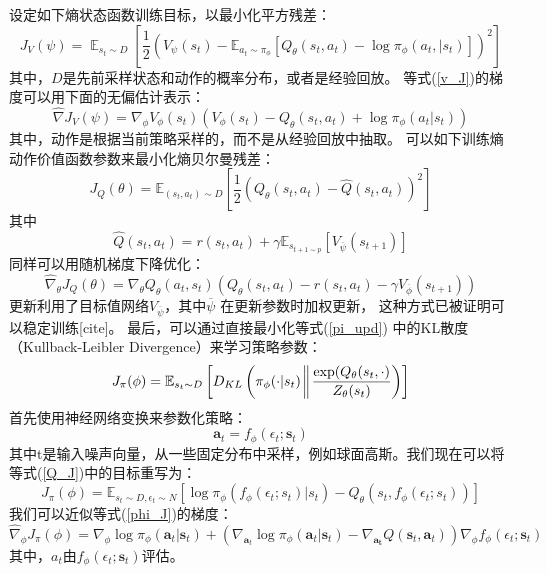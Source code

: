 \documentclass[AutoFakeBold]{LZUThesis}
\begin{document}
设定如下熵状态函数训练目标，以最小化平方残差：
\begin{equation}
  J_{V}(\psi) = \mathop{\mathbb{E}}_{s_t \sim D}
  \left[ \frac12 ( V_{\psi}(s_t) - \mathbb{E}_{a_t \sim \pi_{\phi}}
  \left[ Q_\theta(s_t, a_t) - \log \pi_{\phi}(a_t, | s_t) \right] )^2 \right]
  \label{v_J}
\end{equation}
其中，$D$是先前采样状态和动作的概率分布，或者是经验回放。
等式(\ref{v_J})的梯度可以用下面的无偏估计表示：
\begin{equation}
  \hat{\nabla} J_V(\psi) = \nabla_\phi V_\phi(s_t) 
  (V_\phi(s_t) - Q_\theta(s_t, a_t) + \log \pi_{\phi} (a_t | s_t))
\end{equation}
其中，动作是根据当前策略采样的，而不是从经验回放中抽取。
可以如下训练熵动作价值函数参数来最小化熵贝尔曼残差：
\begin{equation}
  J_Q(\theta) = \mathbb{E}_{(s_t, a_t) \sim D} \left[ 
  \frac12 (Q_\theta(s_t, a_t) - \hat{Q}(s_t, a_t))^2 \right]
\end{equation}
其中
\begin{equation}
  \hat{Q}(s_t, a_t) = r(s_t, a_t) + \gamma 
  \mathbb{E}_{s_{t + 1 \sim p}} \left[ V_{\overline{\psi}}(s_{t + 1}) \right]
\end{equation}
同样可以用随机梯度下降优化：
\begin{equation}
  \hat{\nabla}_\theta J_Q(\theta) = \nabla_\theta Q_\theta(a_t, s_t)
  (Q_\theta(s_t, a_t) - r(s_t, a_t) - \gamma V_{\overline{\phi}}(s_{t + 1}))
\end{equation}
更新利用了目标值网络$V_{\overline{\psi}}$，其中$\overline{\psi}$
在更新参数时加权更新，
这种方式已被证明可以稳定训练[cite]。
最后，可以通过直接最小化等式(\ref{pi_upd})
中的KL散度（Kullback-Leibler Divergence）来学习策略参数：
\begin{equation}
  J_\pi(\phi) = \mathbb{E}_{s_t \sim D} \left[ D_{KL} 
  \left( \pi_{\phi}(\cdot | s_t) \bigg\Arrowvert 
  \frac{\exp (Q_\theta(s_t, \cdot)}{Z_{\theta}(s_t)} \right) \right]
  \label{Q_J}
\end{equation}
首先使用神经网络变换来参数化策略：
\begin{equation}
  \mathbf{a}_t = f_{\phi}(\epsilon_t;\mathbf{s}_t)
\end{equation}
其中t是输入噪声向量，从一些固定分布中采样，例如球面高斯。我们现在可以将等式(\ref{Q_J})中的目标重写为：
\begin{equation}
  J_\pi(\phi) = \mathbb{E}_{s_t \sim D, \epsilon_t \sim N} 
  \left[ \log \pi_\phi(f_{\phi}(\epsilon_t;s_t) | s_t)
  - Q_\theta(s_t, f_\phi(\epsilon_t;s_t)) \right]
  \label{phi_J}
\end{equation}
我们可以近似等式(\ref{phi_J})的梯度：
\begin{equation}
  \hat{\nabla}_\phi J_\pi(\phi) = \nabla_\phi \log\pi_\phi(\mathbf{a}_t | \mathbf{s}_t)
  + (\nabla_{\mathbf{a}_t} \log \pi_\phi(\mathbf{a}_t | \mathbf{s}_t) - 
  \nabla_{\mathbf{a_t}}Q(\mathbf{s}_t, \mathbf{a}_t)) 
  \nabla_\phi f_\phi(\epsilon_t;\mathbf{s}_t)
\end{equation}
其中，$a_t$由$f_\phi(\epsilon_t;\mathbf{s}_t)$评估。
\end{document}
